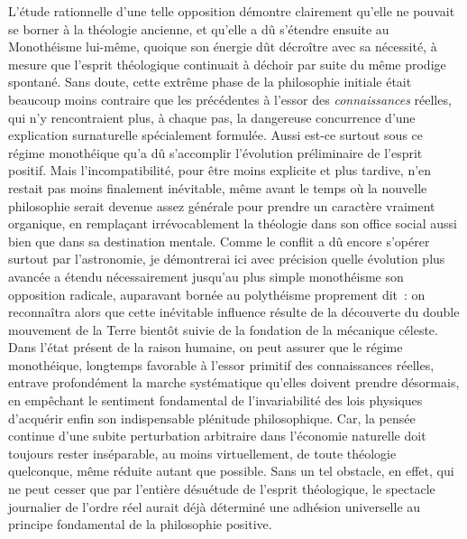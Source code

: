 \documentclass[french,twoside]{book} %
\begin{document}
L’étude rationnelle d’une telle opposition démontre clairement qu’elle ne pouvait se borner à la théologie ancienne, et qu’elle a dû s’étendre ensuite au Monothéisme lui-même, quoique son énergie dût décroître avec sa nécessité, à mesure que l’esprit théologique continuait à déchoir par suite du même prodige spontané. Sans doute, cette extrême phase de la philosophie initiale était beaucoup moins contraire que les précédentes à l’essor des {\itshape connaissances} réelles, qui n’y rencontraient plus, à chaque pas, la dangereuse concurrence d’une explication surnaturelle spécialement formulée. Aussi est-ce surtout sous ce régime monothéique qu’a dû s’accomplir l’évolution préliminaire de l’esprit positif. Mais l’incompatibilité, pour être moins explicite et plus tardive, n’en restait pas moins finalement inévitable, même avant le temps où la nouvelle philosophie serait devenue assez générale pour prendre un caractère vraiment organique, en remplaçant irrévocablement la théologie dans son office social aussi bien que dans sa destination mentale. Comme le conflit a dû encore s’opérer surtout par l’astronomie, je démontrerai ici avec précision quelle évolution plus avancée a étendu nécessairement jusqu’au plus simple monothéisme son opposition radicale, auparavant bornée au polythéisme proprement dit : on reconnaîtra alors que cette inévitable influence résulte de la découverte du double mouvement de la Terre bientôt suivie de la fondation de la mécanique céleste. Dans l’état présent de la raison humaine, on peut assurer que le régime monothéique, longtemps favorable à l’essor primitif des connaissances réelles, entrave profondément la marche systématique qu’elles doivent prendre désormais, en empêchant le sentiment fondamental de l’invariabilité des lois physiques d’acquérir enfin son indispensable plénitude philosophique. Car, la pensée continue d’une subite perturbation arbitraire dans l’économie naturelle doit toujours rester inséparable, au moins virtuellement, de toute théologie quelconque, même réduite autant que possible. Sans un tel obstacle, en effet, qui ne peut cesser que par l’entière désuétude de l’esprit théologique, le spectacle journalier de l’ordre réel aurait déjà déterminé une adhésion universelle au principe fondamental de la philosophie positive.\par
\end{document}

